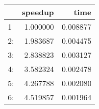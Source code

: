\begin{tabular}{lrr}
\toprule
{} &   speedup &      time \\
\midrule
1  &  1.000000 &  0.008877 \\
2: &  1.983687 &  0.004475 \\
3: &  2.838823 &  0.003127 \\
4: &  3.582324 &  0.002478 \\
5: &  4.267788 &  0.002080 \\
6: &  4.519857 &  0.001964 \\
\bottomrule
\end{tabular}
